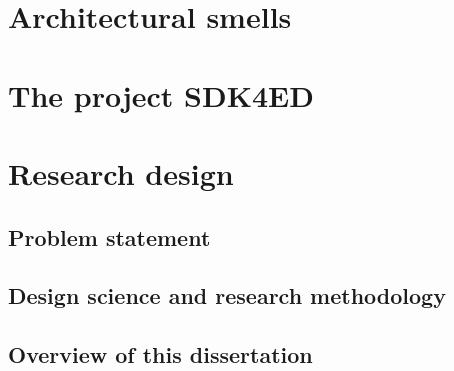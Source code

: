 \section{Architectural smells}

\section{The project SDK4ED}

\section{Research design}
\subsection{Problem statement}
\subsection{Design science and research methodology}
\subsection{Overview of this dissertation}

